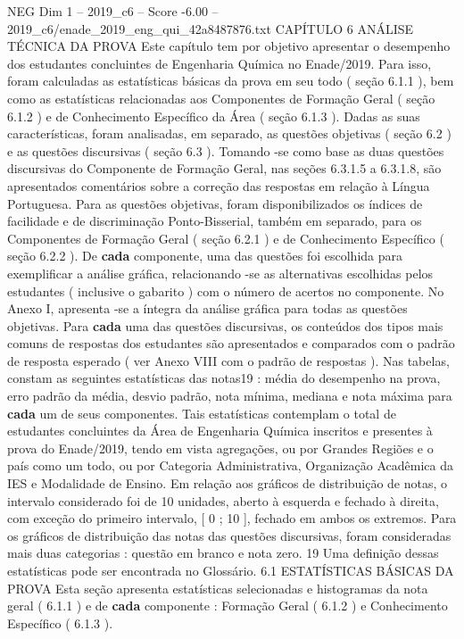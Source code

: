 \begin{textsample}{NEG Dim 1 – 2019\_c6 – Score -6.00 – 2019\_c6/enade\_2019\_eng\_qui\_42a8487876.txt}  \label{ex:f1_neg_093}
CAPÍTULO 6 ANÁLISE TÉCNICA DA PROVA Este capítulo tem por objetivo apresentar o desempenho dos estudantes concluintes de Engenharia Química no Enade/2019.
Para isso, foram calculadas as estatísticas básicas da prova em seu todo ( seção 6.1.1 ), bem como as estatísticas relacionadas aos Componentes de Formação Geral ( seção 6.1.2 ) e de Conhecimento Específico da Área ( seção 6.1.3 ).
Dadas as suas características, foram analisadas, em separado, as questões objetivas ( seção 6.2 ) e as questões discursivas ( seção 6.3 ).
Tomando -se como base as duas questões discursivas do Componente de Formação Geral, nas seções 6.3.1.5 a 6.3.1.8, são apresentados comentários sobre a correção das respostas em relação à Língua Portuguesa.
Para as questões objetivas, foram disponibilizados os índices de facilidade e de discriminação Ponto-Bisserial, também em separado, para os Componentes de Formação Geral ( seção 6.2.1 ) e de Conhecimento Específico ( seção 6.2.2 ).
De \textbf{cada} componente, uma das questões foi escolhida para exemplificar a análise gráfica, relacionando -se as alternativas escolhidas pelos estudantes ( inclusive o gabarito ) com o número de acertos no componente.
No Anexo I, apresenta -se a íntegra da análise gráfica para todas as questões objetivas.
Para \textbf{cada} uma das questões discursivas, os conteúdos dos tipos mais comuns de respostas dos estudantes são apresentados e comparados com o padrão de resposta esperado ( ver Anexo VIII com o padrão de respostas ).
Nas tabelas, constam as seguintes estatísticas das notas19 : média do desempenho na prova, erro padrão da média, desvio padrão, nota mínima, mediana e nota máxima para \textbf{cada} um de seus componentes.
Tais estatísticas contemplam o total de estudantes concluintes da Área de Engenharia Química inscritos e presentes à prova do Enade/2019, tendo em vista agregações, ou por Grandes Regiões e o país como um todo, ou por Categoria Administrativa, Organização Acadêmica da IES e Modalidade de Ensino.
Em relação aos gráficos de distribuição de notas, o intervalo considerado foi de 10 unidades, aberto à esquerda e fechado à direita, com exceção do primeiro intervalo, [ 0 ; 10 ], fechado em ambos os extremos.
Para os gráficos de distribuição das notas das questões discursivas, foram consideradas mais duas categorias : questão em branco e nota zero. 19 Uma definição dessas estatísticas pode ser encontrada no Glossário. 6.1 ESTATÍSTICAS BÁSICAS DA PROVA Esta seção apresenta estatísticas selecionadas e histogramas da nota geral ( 6.1.1 ) e de \textbf{cada} componente : Formação Geral ( 6.1.2 ) e Conhecimento Específico ( 6.1.3 ).

\end{textsample}
